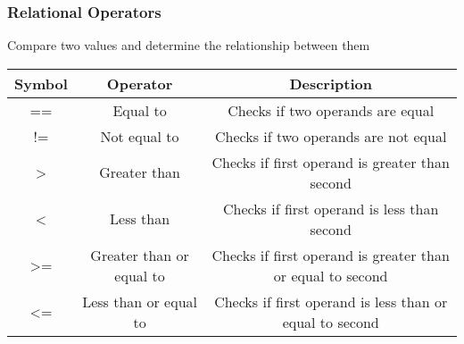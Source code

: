 \documentclass[11pt,A4]{article}
\begin{document}
            \subsubsection{Relational Operators}
            Compare two values and determine the relationship between them
            \begin{table}[h]
                \centering
                \setlength{\arrayrulewidth}{0.3mm}
                \renewcommand{\arraystretch}{1.2}
                \begin{tabular}{ccc}
                    \toprule
                    Symbol & Operator & Description \\
                    \midrule
                    == & Equal to & Checks if two operands are equal \\
                    \arrayrulecolor{gray!50}\cmidrule(lr){1-3}\arrayrulecolor{black}
                    != & Not equal to & Checks if two operands are not equal \\
                    \arrayrulecolor{gray!50}\cmidrule(lr){1-3}\arrayrulecolor{black}
                    > & Greater than & Checks if first operand is greater than second \\
                    \arrayrulecolor{gray!50}\cmidrule(lr){1-3}\arrayrulecolor{black}
                    < & Less than & Checks if first operand is less than second \\
                    \arrayrulecolor{gray!50}\cmidrule(lr){1-3}\arrayrulecolor{black}
                    >= & Greater than or equal to & Checks if first operand is greater than or equal to second \\
                    \arrayrulecolor{gray!50}\cmidrule(lr){1-3}\arrayrulecolor{black}
                    <= & Less than or equal to & Checks if first operand is less than or equal to second \\
                    \bottomrule
                \end{tabular}
            \end{table}  \\ 
                        
\end{document}
